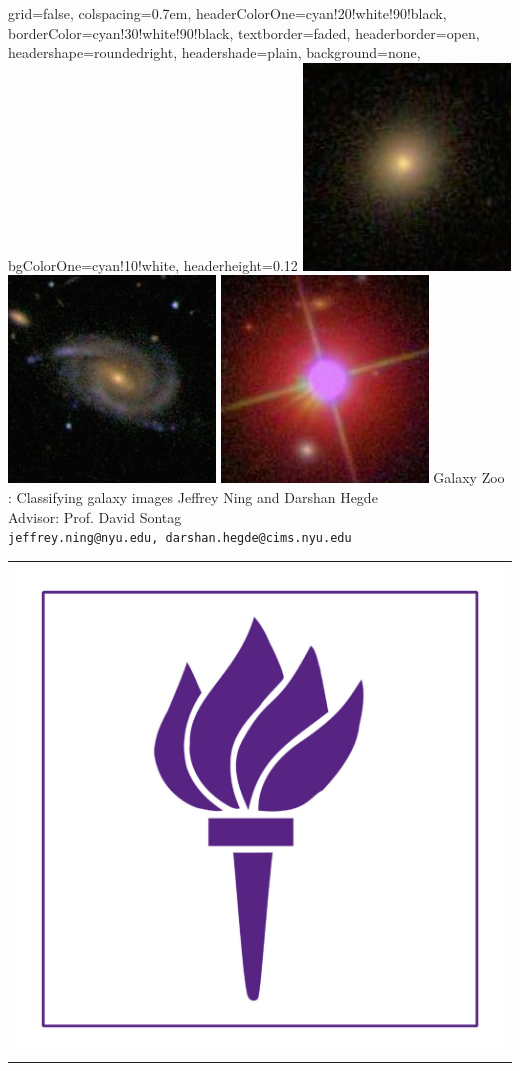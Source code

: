 \documentclass[landscape,a0paper,fontscale=0.292]{baposter}
\begin{document}
\begin{poster}{
 grid=false,
 colspacing=0.7em,
 headerColorOne=cyan!20!white!90!black,
 borderColor=cyan!30!white!90!black,
 textborder=faded,
 headerborder=open,
 headershape=roundedright,
 headershade=plain,
 background=none,
 bgColorOne=cyan!10!white,
 headerheight=0.12\textheight}
 {
      \includegraphics[width=0.08\linewidth]{Class1_1.jpg}
      \includegraphics[width=0.08\linewidth]{Class1_2.jpg}
      \includegraphics[width=0.08\linewidth]{Class1_3.jpg}
 }
 {\sc\Huge Galaxy Zoo : Classifying galaxy images}
 {Jeffrey Ning and Darshan Hegde\\Advisor: Prof. David Sontag\\[1em]
 {\texttt{jeffrey.ning@nyu.edu, darshan.hegde@cims.nyu.edu}}}
 {
  \begin{tabular}{r}
    \includegraphics[height=0.12\textheight]{NYUTorch.jpg}\\
  \end{tabular}
 }


\end{poster}
\end{document}
